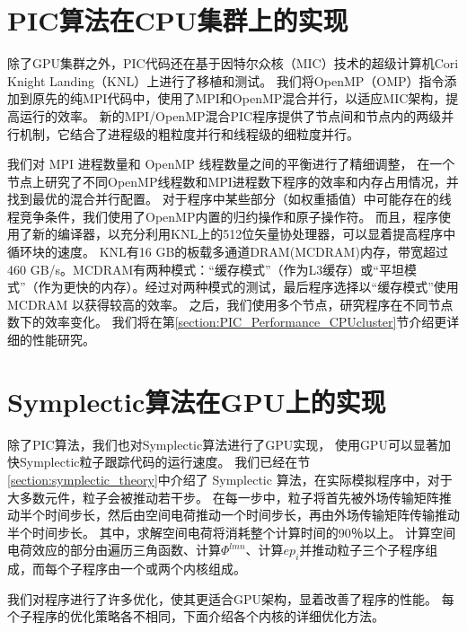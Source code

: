 \section{PIC算法在CPU集群上的实现}        \label{section:PIC_Code_CPUcluster}
除了GPU集群之外，PIC代码还在基于因特尔众核（MIC）技术的超级计算机Cori Knight Landing（KNL）上进行了移植和测试。
我们将OpenMP（OMP）指令添加到原先的纯MPI代码中，使用了MPI和OpenMP混合并行，以适应MIC架构，提高运行的效率。
新的MPI/OpenMP混合PIC程序提供了节点间和节点内的两级并行机制，它结合了进程级的粗粒度并行和线程级的细粒度并行。

我们对 MPI 进程数量和 OpenMP 线程数量之间的平衡进行了精细调整，
在一个节点上研究了不同OpenMP线程数和MPI进程数下程序的效率和内存占用情况，并找到最优的混合并行配置。
对于程序中某些部分（如权重插值）中可能存在的线程竞争条件，我们使用了OpenMP内置的归约操作和原子操作符。
而且，程序使用了新的编译器，以充分利用KNL上的512位矢量协处理器，可以显着提高程序中循环块的速度。
KNL有16 GB的板载多通道DRAM(MCDRAM)内存，带宽超过460 GB/s。MCDRAM有两种模式：“缓存模式”（作为L3缓存）或“平坦模式”（作为更快的内存）。经过对两种模式的测试，最后程序选择以“缓存模式”使用 MCDRAM 以获得较高的效率。
之后，我们使用多个节点，研究程序在不同节点数下的效率变化。
我们将在第\eqref{section:PIC_Performance_CPUcluster}节介绍更详细的性能研究。

\section{Symplectic算法在GPU上的实现}     \label{section:symplectic_GPU}
除了PIC算法，我们也对Symplectic算法进行了GPU实现，
使用GPU可以显著加快Symplectic粒子跟踪代码的运行速度。
我们已经在节\eqref{section:symplectic_theory}中介绍了 Symplectic 算法，在实际模拟程序中，对于大多数元件，粒子会被推动若干步。
在每一步中，粒子将首先被外场传输矩阵推动半个时间步长，然后由空间电荷推动一个时间步长，再由外场传输矩阵传输推动半个时间步长。
其中，求解空间电荷将消耗整个计算时间的90％以上。 计算空间电荷效应的部分由遍历三角函数、计算$\Phi^{lmn}$、计算$ep_i$并推动粒子三个子程序组成，而每个子程序由一个或两个内核组成。

我们对程序进行了许多优化，使其更适合GPU架构，显着改善了程序的性能。 每个子程序的优化策略各不相同，下面介绍各个内核的详细优化方法。
